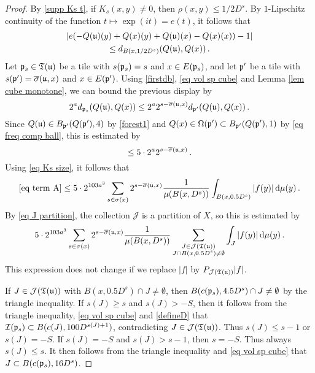 \begin{proof}
    By \eqref{supp Ks t}, if $K_s(x,y)\neq 0$, then $\rho(x,y)\leq 1/2 D^s$. By $1$-Lipschitz continuity of the function $t \mapsto \exp(it) = e(t)$, it follows that
    \begin{multline*}
        |e(-Q(\mathfrak u)(y)+Q(x)(y)+Q(\mathfrak u)(x)-Q(x)(x))-1|\\
        \leq d_{B(x, 1/2 D^{s})}(Q(\mathfrak u), Q(x))\,.
    \end{multline*}
    Let $\mathfrak p_s \in \mathfrak T(\mathfrak u)$ be a tile with $s(\mathfrak p_s) = s$ and $x \in E(\mathfrak p_s)$, and let $\mathfrak p'$ be a tile with $s(\mathfrak p') = \overline{\sigma}(\mathfrak u, x)$ and $x \in E(\mathfrak p')$.
    Using \eqref{firstdb}, \eqref{eq vol sp cube} and Lemma \ref{lem cube monotone}, we can bound the previous display by
    $$
        2^a d_{\mathfrak p_s}(Q(\mathfrak u), Q(x)) \le 2^{a} 2^{s - \overline{\sigma}(\mathfrak u, x)} d_{\mathfrak p'}(Q(\mathfrak u), Q(x))\,.
    $$
    Since $Q(\mathfrak u) \in B_{\mathfrak p'}(Q(\mathfrak p'), 4)$ by \eqref{forest1} and $Q(x) \in \Omega(\mathfrak p') \subset B_{\mathfrak p'}(Q(\mathfrak p'), 1)$ by \eqref{eq freq comp ball}, this is estimated by
    $$
        \le 5 \cdot 2^{a} 2^{s - \overline{\sigma}(\mathfrak u, x)} \,.
    $$
    Using \eqref{eq Ks size}, it follows that
    $$
        \eqref{eq term A} \le 5\cdot 2^{103a^3} \sum_{s\in\sigma(x)}2^{s - \overline{\sigma}(\mathfrak u, x)} \frac{1}{\mu(B(x,D^s))}\int_{B(x,0.5D^{s})}|f(y)|\,\mathrm{d}\mu(y)\,.
    $$
    By \eqref{eq J partition}, the collection $\mathcal{J}$ is a partition of $X$, so this is estimated by
    $$
            5\cdot 2^{103a^3} \sum_{s\in\sigma(x)}2^{s - \overline{\sigma}(\mathfrak u, x)} \frac{1}{\mu(B(x,D^s))}\sum_{\substack{J \in \mathcal{J}(\mathfrak T(\mathfrak u))\\J \cap B(x, 0.5D^s) \ne \emptyset} }\int_{J}|f(y)|\,\mathrm{d}\mu(y)\,.
    $$
    This expression does not change if we replace $|f|$ by $P_{\mathcal{J}(\mathfrak T(\mathfrak u))}|f|$.

    If $J \in \mathcal{J}(\mathfrak T(\mathfrak u))$ with $B(x, 0.5 D^s) \cap J \ne \emptyset$, then $B(c(\mathfrak p_s), 4.5D^s) \cap J \ne \emptyset$ by the triangle inequality. If $s(J) \ge s$ and $s(J) > -S$, then it follows from the triangle inequality, \eqref{eq vol sp cube} and \eqref{defineD} that $\mathcal{I}(\mathfrak p_s) \subset B(c(J), 100 D^{s(J)+1})$, contradicting $J \in \mathcal{J}(\mathfrak{T}(\mathfrak u))$. Thus $s(J) \le s - 1$ or $s(J) = -S$. If $s(J) = -S$ and $s(J) > s - 1$, then $s = -S$. Thus always $s(J) \le s$. It then follows from the triangle inequality and \eqref{eq vol sp cube} that $J \subset B(c(\mathfrak p_s), 16 D^s)$.


\end{proof}
